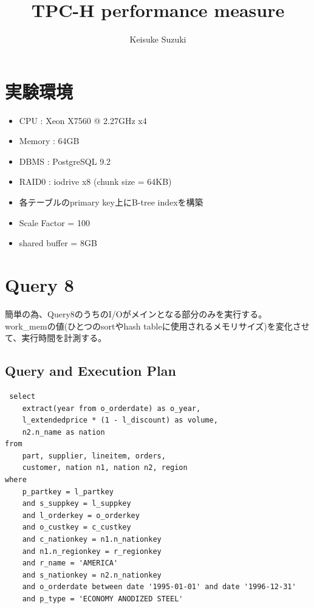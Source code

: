 \documentclass[11pt,a4paper]{jsarticle}
\title{TPC-H performance measure}
\author{Keisuke Suzuki}
\begin{document}
\maketitle
\section{実験環境}
\begin{itemize}
 \item CPU : Xeon X7560 @ 2.27GHz x4
 \item Memory : 64GB
 \item DBMS : PostgreSQL 9.2
 \item RAID0 : iodrive x8 (chunk size = 64KB)
 \item 各テーブルのprimary key上にB-tree indexを構築
 \item Scale Factor = 100
 \item shared buffer = 8GB
\end{itemize}

\clearpage
\section{Query 8}
簡単の為、Query8のうちのI/Oがメインとなる部分のみを実行する。
work\_memの値(ひとつのsortやhash tableに使用されるメモリサイズ)を変化させて、実行時間を計測する。

\subsection{Query and Execution Plan}
\begin{verbatim}
 select
	extract(year from o_orderdate) as o_year,
	l_extendedprice * (1 - l_discount) as volume,
	n2.n_name as nation
from
	part, supplier, lineitem, orders,
	customer, nation n1, nation n2,	region
where
	p_partkey = l_partkey
	and s_suppkey = l_suppkey
	and l_orderkey = o_orderkey
	and o_custkey = c_custkey
	and c_nationkey = n1.n_nationkey
	and n1.n_regionkey = r_regionkey
	and r_name = 'AMERICA'
	and s_nationkey = n2.n_nationkey
	and o_orderdate between date '1995-01-01' and date '1996-12-31'
	and p_type = 'ECONOMY ANODIZED STEEL'
\end{verbatim}
\end{document}
